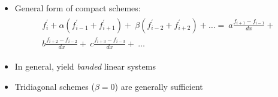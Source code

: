 \begin{frame}
    \begin{itemize}
    \item {General form of compact schemes:
    \begin{align*}
        \begin{split}
            f_i^{\prime} + \alpha(f^{\prime}_{i-1} + f^{\prime}_{i+1}) + \
            \beta(f^{\prime}_{i-2} + f^{\prime}_{i+2}) + \hdots  = \
            a\frac{f_{i+1} - f_{i-1}}{dx} + \\
            b\frac{f_{i+2} - f_{i-2}}{dx} + \
            c\frac{f_{i+3} - f_{i-3}}{dx} + \
            \hdots
        \end{split}
    \end{align*}}
    \item In general, yield \emph{banded} linear systems
    \item Tridiagonal schemes ($\beta=0$) are generally sufficient
    \end{itemize}
\end{frame}
